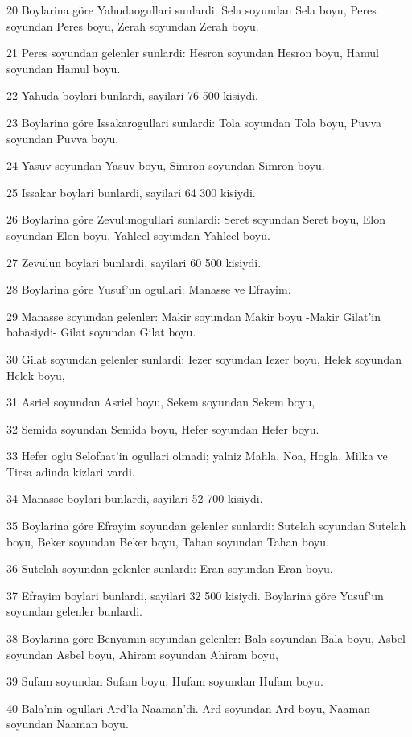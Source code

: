 \par 20 Boylarina göre Yahudaogullari sunlardi: Sela soyundan Sela boyu, Peres soyundan Peres boyu, Zerah soyundan Zerah boyu.
\par 21 Peres soyundan gelenler sunlardi: Hesron soyundan Hesron boyu, Hamul soyundan Hamul boyu.
\par 22 Yahuda boylari bunlardi, sayilari 76 500 kisiydi.
\par 23 Boylarina göre Issakarogullari sunlardi: Tola soyundan Tola boyu, Puvva soyundan Puvva boyu,
\par 24 Yasuv soyundan Yasuv boyu, Simron soyundan Simron boyu.
\par 25 Issakar boylari bunlardi, sayilari 64 300 kisiydi.
\par 26 Boylarina göre Zevulunogullari sunlardi: Seret soyundan Seret boyu, Elon soyundan Elon boyu, Yahleel soyundan Yahleel boyu.
\par 27 Zevulun boylari bunlardi, sayilari 60 500 kisiydi.
\par 28 Boylarina göre Yusuf'un ogullari: Manasse ve Efrayim.
\par 29 Manasse soyundan gelenler: Makir soyundan Makir boyu -Makir Gilat'in babasiydi- Gilat soyundan Gilat boyu.
\par 30 Gilat soyundan gelenler sunlardi: Iezer soyundan Iezer boyu, Helek soyundan Helek boyu,
\par 31 Asriel soyundan Asriel boyu, Sekem soyundan Sekem boyu,
\par 32 Semida soyundan Semida boyu, Hefer soyundan Hefer boyu.
\par 33 Hefer oglu Selofhat'in ogullari olmadi; yalniz Mahla, Noa, Hogla, Milka ve Tirsa adinda kizlari vardi.
\par 34 Manasse boylari bunlardi, sayilari 52 700 kisiydi.
\par 35 Boylarina göre Efrayim soyundan gelenler sunlardi: Sutelah soyundan Sutelah boyu, Beker soyundan Beker boyu, Tahan soyundan Tahan boyu.
\par 36 Sutelah soyundan gelenler sunlardi: Eran soyundan Eran boyu.
\par 37 Efrayim boylari bunlardi, sayilari 32 500 kisiydi. Boylarina göre Yusuf'un soyundan gelenler bunlardi.
\par 38 Boylarina göre Benyamin soyundan gelenler: Bala soyundan Bala boyu, Asbel soyundan Asbel boyu, Ahiram soyundan Ahiram boyu,
\par 39 Sufam soyundan Sufam boyu, Hufam soyundan Hufam boyu.
\par 40 Bala'nin ogullari Ard'la Naaman'di. Ard soyundan Ard boyu, Naaman soyundan Naaman boyu.

